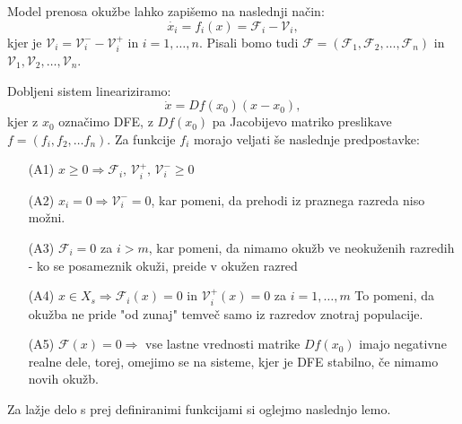 \documentclass[a4paper,12pt]{article}
\newcommand{\F}{\mathcal F}
\newcommand{\V}{\mathcal V}
\begin{document}
Model prenosa okužbe lahko zapišemo na naslednji način:
\begin{equation} \label{eq1}
\dot{x_i}=f_i(x)=\F_i - \V_i,
\end{equation}
kjer je \(\V_i=\V_i^- - \V_i^+\) in \(i=1,\ldots,n\). 
Pisali bomo tudi \(\F=(\F_1,\F_2,\ldots,\F_n)\) in \(\V_1,\V_2,\ldots,\V_n\).

Dobljeni sistem lineariziramo:
\begin{equation} \label{eq2}
\dot{x}=Df(x_0)(x-x_0),
\end{equation}
kjer z \(x_0\) označimo DFE, z \(Df(x_0)\) pa Jacobijevo matriko preslikave 
\(f=(f_i, f_2, \ldots f_n)\).
Za funkcije \(f_i\)
morajo veljati še naslednje predpostavke:

\begin{itemize}
    \item[(A1)] \(x\geq 0 \Rightarrow \F_i\textrm{, }\V_i^+\textrm{, }\V_i^- \geq 0\)
    \item[(A2)] \(x_i=0 \Rightarrow \V_i^- =0\), kar pomeni, da prehodi iz praznega 
    razreda niso možni. 
    \item[(A3)] \(\F_i=0\) za \(i>m\), kar pomeni, da nimamo okužb ve neokuženih razredih - 
    ko se posameznik okuži, preide v okužen razred 
    \item[(A4)] \(x\in X_s \Rightarrow \F_i(x)=0\) in \(\V_i^+(x)=0\) za \(i=1,\ldots,m\)
    To pomeni, da okužba ne pride "od zunaj" temveč samo iz razredov znotraj populacije. 
    \item[(A5)] \(\F(x)=0 \Rightarrow\) vse lastne vrednosti matrike \(Df(x_0)\) imajo 
    negativne realne dele, torej, omejimo se na sisteme, kjer je DFE stabilno, če nimamo novih okužb.    
\end{itemize}

Za lažje delo s prej definiranimi funkcijami si oglejmo naslednjo lemo.
\end{document}
